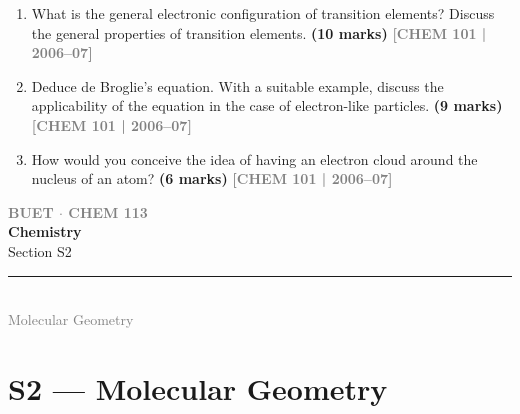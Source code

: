\documentclass[12pt,a3paper]{article}
\newcommand{\yr}[1]{\hfill\textcolor{gray}{\small\textbf{[#1]}}}
\newcommand{\mk}[1]{\textcolor{orange!70!black}{\small\textbf{(#1 marks)}}}
\newcommand{\secdivider}[4]{%
  \newpage\thispagestyle{empty}%
  \vspace*{\fill}%
  \begin{tcolorbox}[enhanced,colback=#4!7,colframe=#3,boxrule=1.5pt,arc=8pt,
    left=20pt,right=20pt,top=22pt,bottom=22pt,
    shadow={3pt}{-3pt}{0pt}{black!15}]
    \centering
    {\large\textcolor{gray}{\textbf{BUET $\cdot$ CHEM 113}}}\\[8pt]
    {\fontsize{26}{32}\selectfont\bfseries\textcolor{#3}{Chemistry}}\\[6pt]
    {\fontsize{15}{19}\selectfont\textcolor{dgray}{#1}}\\[12pt]
    \textcolor{#3!60}{\rule{0.5\textwidth}{0.5pt}}\\[6pt]
    {\small\textcolor{gray}{#2}}
  \end{tcolorbox}%
  \vspace*{\fill}\newpage%
}
\begin{document}
\begin{enumerate}
\item What is the general electronic configuration of transition elements? Discuss the general properties of transition elements. \mk{10}
\yr{CHEM 101 | 2006--07}



\item Deduce de Broglie's equation. With a suitable example, discuss the applicability of the equation in the case of electron-like particles. \mk{9}
\yr{CHEM 101 | 2006--07}



\item How would you conceive the idea of having an electron cloud around the nucleus of an atom? \mk{6}
\yr{CHEM 101 | 2006--07}


\end{enumerate}
\newpage

\secdivider{Section S2}{Molecular Geometry}{cB}{cB}
  \label{sec:S2}
\section{S2 --- Molecular Geometry}
\end{document}
